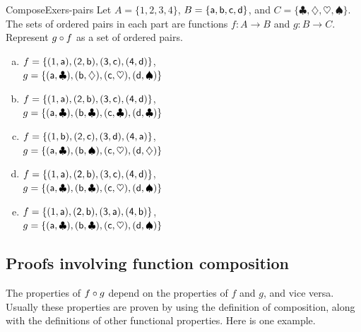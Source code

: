 \begin{exercise}{ComposeExers-pairs} 
 Let $A = \{1,2,3,4\}$, $B = \{\sf{a},\sf{b},\sf{c},\sf{d}\}$, and $C = \{\clubsuit, \diamondsuit, \heartsuit, \spadesuit\}$. The sets of ordered pairs in each part are functions $f \colon A \to B$ and $g \colon B \to C$. Represent $g \circ f$ as a set of ordered pairs.
\smallskip
\begin{enumerate}[(a)]
\item \label{ComposeExers-pairs-(abcd)(cdhs)} 
 $f = \{(1,\sf{a}), (2,\sf{b}), (3,\sf{c}), (4,\sf{d})\}$,
 \\ $g = \{(\sf{a},\clubsuit), (\sf{b},\diamondsuit), (\sf{c},\heartsuit), (\sf{d},\spadesuit) \}$
\smallskip
\item \label{ComposeExers-pairs-(abcd)(cccc)} 
 $f = \{(1,\sf{a}), (2,\sf{b}), (3,\sf{c}), (4,\sf{d})\}$,
 \\ $g = \{(\sf{a},\clubsuit), (\sf{b},\clubsuit), (\sf{c},\clubsuit), (\sf{d},\clubsuit) \}$
\smallskip
\item \label{ComposeExers-pairs-(bcda)(cshd)} 
 $f = \{(1,\sf{b}), (2,\sf{c}), (3,\sf{d}), (4,\sf{a})\}$,
 \\ $g = \{(\sf{a},\clubsuit), (\sf{b}, \spadesuit), (\sf{c},\heartsuit), (\sf{d}, \diamondsuit) \}$
\smallskip
\item \label{ComposeExers-pairs-(abcd)(cchs)} 
 $f = \{(1,\sf{a}), (2,\sf{b}), (3,\sf{c}), (4,\sf{d})\}$,
 \\ $g= \{(\sf{a},\clubsuit), (\sf{b},\clubsuit), (\sf{c}, \heartsuit), (\sf{d}, \spadesuit) \}$
\smallskip
\item \label{ComposeExers-pairs-(abab)(cchs)} 
 $f = \{(1,\sf{a}), (2,\sf{b}), (3,\sf{a}), (4,\sf{b})\}$,
 \\ $g = \{(\sf{a},\clubsuit), (\sf{b},\clubsuit), (\sf{c}, \heartsuit), (\sf{d}, \spadesuit) \}$
\end{enumerate}
\end{exercise}


\subsection{Proofs involving function composition}

The properties of $f \circ g$ depend on the properties of $f$ and $g$, and vice versa. Usually these properties are proven by using the definition of composition, along with the definitions of other functional properties.  Here is one example.

